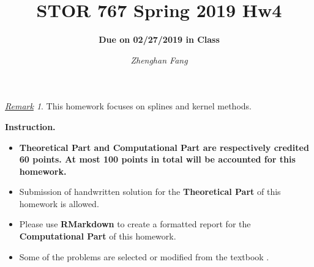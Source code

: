 \documentclass[10pt]{article}
\title{STOR 767 Spring 2019 Hw4}
\subtitle{\textbf{Due on 02/27/2019 in Class}}
\author{\it Zhenghan Fang}
\date{}
\theoremstyle{definition}
\theoremstyle{remark}
\newtheorem*{rmk}{\underline{Remark}}
\begin{document}
	\maketitle
	

\begin{rmk}
	This homework focuses on splines and kernel methods. 
\end{rmk}

\noindent \textbf{Instruction.}
\begin{itemize}
	\item {\bf Theoretical Part and Computational Part are respectively credited 60 points. At most 100 points in total will be accounted for this homework.}
	
	\item Submission of handwritten solution for the \textbf{Theoretical Part} of this homework is allowed.
	
	\item Please use \textbf{RMarkdown} to create a formatted report for the \textbf{Computational Part} of this homework. 

	\item Some of the problems are selected or modified from the textbook \cite{friedman2009elements}.
	
\end{itemize}
\end{document}
